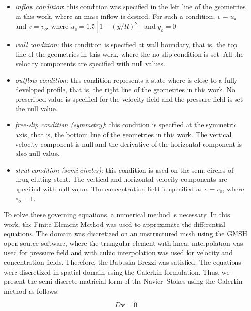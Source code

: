 \documentclass[10pt,fleqn,a4paper,twoside]{article}
\begin{document}
\begin{itemize}
\item {\textit{inflow condition}:
 this condition was specified in the left line of the geometries in
 this work, where an mass inflow is desired.
 For such a condition, $u = u_{o}$
 and $v = v_{o}$, where $u_{o}=1.5[1-(y/R)^{2}]$ and $y_{o}=0$}
 \item {\textit{wall condition}:
 this condition is specified at wall boundary, that is,
 the top line of the geometries in this work, where
 the no-slip condition is set.
 All the velocity components are specified with
 null values.}
 \item {\textit{outflow condition}:
 this condition represents a state where is close to a
 fully developed profile, that is, the right line of the
 geometries in this work.
 No prescribed value is specified for the velocity field
 and the pressure field is set the null value.}
 \item {\textit{free-slip condition (symmetry)}:
 this condition is specified at the symmetric axis,
 that is, the bottom line of the geometries in this work.
 The vertical velocity component is null and the derivative of
 the horizontal component is also null value.}
 \item {\textit{strut condition (semi-circles)}:
 this condition is used on the semi-circles of drug-eluting stent.
 The vertical and horizontal
 velocity components are specified with null value.
 The concentration field is specified as $e=e_{o}$, where $e_{o}=1$.}
\end{itemize}


To solve these governing equations, a numerical method is necessary. In this work, the
Finite Element Method was used to approximate the differential equations.
The domain was discretized on an unstructured mesh using the
GMSH open source software, 
where the triangular element with linear interpolation
was used for pressure field and with cubic interpolation
was used for velocity and concentration fields.
Therefore, the Babuska-Brezzi \cite{babuska1971}\cite{brezzi1974} 
was
satisfied. 
The equations were discretized in spatial domain using the Galerkin formulation.
Thus, we present the semi-discrete
matricial form of the Navier--Stokes using the Galerkin method
as follows:


\vspace{-0.4cm}
\begin{equation}
 D\textbf{v} = 0
\end{equation}
\end{document}
